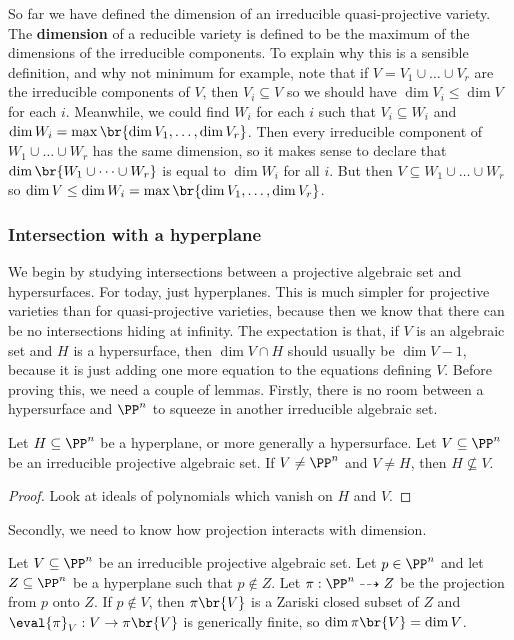 So far we have defined the dimension of an irreducible quasi-projective variety. The \textbf{dimension} of a reducible variety is defined to be the maximum of the dimensions of the irreducible components. To explain why this is a sensible definition, and why not minimum for example, note that if $ V = V_1 \cup \dots \cup V_r $ are the irreducible components of $ V $, then $ V_i \subseteq V $ so we should have $ \dim V_i \le \dim V $ for each $ i $. Meanwhile, we could find $ W_i $ for each $ i $ such that $ V_i \subseteq W_i $ and $ \dim W_i = \max\br{\dim V_1, \dots, \dim V_r} $. Then every irreducible component of $ W_1 \cup \dots \cup W_r $ has the same dimension, so it makes sense to declare that $ \dim\br{W_1 \cup \dots \cup W_r} $ is equal to $ \dim W_i $ for all $ i $. But then $ V \subseteq W_1 \cup \dots \cup W_r $ so $ \dim V \le \dim W_i = \max\br{\dim V_1, \dots, \dim V_r} $.

\subsubsection{Intersection with a hyperplane}

We begin by studying intersections between a projective algebraic set and hypersurfaces. For today, just hyperplanes. This is much simpler for projective varieties than for quasi-projective varieties, because then we know that there can be no intersections hiding at infinity. The expectation is that, if $ V $ is an algebraic set and $ H $ is a hypersurface, then $ \dim V \cap H $ should usually be $ \dim V - 1 $, because it is just adding one more equation to the equations defining $ V $. Before proving this, we need a couple of lemmas. Firstly, there is no room between a hypersurface and $ \PP^n $ to squeeze in another irreducible algebraic set.

\begin{lemma}
\label{lem:hypersurfaceirreducible}
Let $ H \subseteq \PP^n $ be a hyperplane, or more generally a hypersurface. Let $ V \subseteq \PP^n $ be an irreducible projective algebraic set. If $ V \ne \PP^n $ and $ V \ne H $, then $ H \not\subseteq V $.
\end{lemma}

\begin{proof}
Look at ideals of polynomials which vanish on $ H $ and $ V $.
\end{proof}

Secondly, we need to know how projection interacts with dimension.

\begin{lemma}
\label{lem:projectiondimension}
Let $ V \subseteq \PP^n $ be an irreducible projective algebraic set. Let $ p \in \PP^n $ and let $ Z \subseteq \PP^n $ be a hyperplane such that $ p \notin Z $. Let $ \pi : \PP^n \dashrightarrow Z $ be the projection from $ p $ onto $ Z $. If $ p \notin V $, then $ \pi\br{V} $ is a Zariski closed subset of $ Z $ and $ \eval{\pi}_V : V \to \pi\br{V} $ is generically finite, so $ \dim \pi\br{V} = \dim V $.
\end{lemma}


